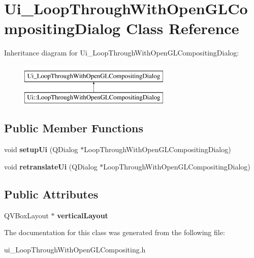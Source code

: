 \hypertarget{classUi__LoopThroughWithOpenGLCompositingDialog}{
\section{Ui\_\-LoopThroughWithOpenGLCompositingDialog Class Reference}
\label{classUi__LoopThroughWithOpenGLCompositingDialog}
}
Inheritance diagram for Ui\_\-LoopThroughWithOpenGLCompositingDialog:\begin{figure}[H]
\begin{center}
\leavevmode
\includegraphics[height=2.000000cm]{classUi__LoopThroughWithOpenGLCompositingDialog}
\end{center}
\end{figure}
\subsection*{Public Member Functions}
\begin{DoxyCompactItemize}
\item 
\hypertarget{classUi__LoopThroughWithOpenGLCompositingDialog_a1d92e6b1a53ddc238314b693d0a9454a}{
void {\bfseries setupUi} (QDialog $\ast$LoopThroughWithOpenGLCompositingDialog)}
\label{classUi__LoopThroughWithOpenGLCompositingDialog_a1d92e6b1a53ddc238314b693d0a9454a}

\item 
\hypertarget{classUi__LoopThroughWithOpenGLCompositingDialog_a9310c5d62a2151eadec44bee103cf58c}{
void {\bfseries retranslateUi} (QDialog $\ast$LoopThroughWithOpenGLCompositingDialog)}
\label{classUi__LoopThroughWithOpenGLCompositingDialog_a9310c5d62a2151eadec44bee103cf58c}

\end{DoxyCompactItemize}
\subsection*{Public Attributes}
\begin{DoxyCompactItemize}
\item 
\hypertarget{classUi__LoopThroughWithOpenGLCompositingDialog_a08323b4d0e4837e5ba449a9d33d10b0e}{
QVBoxLayout $\ast$ {\bfseries verticalLayout}}
\label{classUi__LoopThroughWithOpenGLCompositingDialog_a08323b4d0e4837e5ba449a9d33d10b0e}

\end{DoxyCompactItemize}


The documentation for this class was generated from the following file:\begin{DoxyCompactItemize}
\item 
ui\_\-LoopThroughWithOpenGLCompositing.h\end{DoxyCompactItemize}
